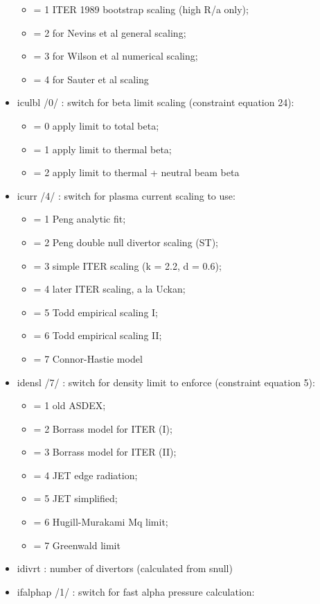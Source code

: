 \documentclass[]{article}
\providecommand{\tightlist}{%
  \setlength{\itemsep}{0pt}\setlength{\parskip}{0pt}}
\begin{document}
\begin{itemize}
  \begin{itemize}
  \tightlist
  \item
    = 1 ITER 1989 bootstrap scaling (high R/a only);
  \item
    = 2 for Nevins et al general scaling;
  \item
    = 3 for Wilson et al numerical scaling;
  \item
    = 4 for Sauter et al scaling
  \end{itemize}
\item
  iculbl /0/ : switch for beta limit scaling (constraint equation 24):

  \begin{itemize}
  \tightlist
  \item
    = 0 apply limit to total beta;
  \item
    = 1 apply limit to thermal beta;
  \item
    = 2 apply limit to thermal + neutral beam beta
  \end{itemize}
\item
  icurr /4/ : switch for plasma current scaling to use:

  \begin{itemize}
  \tightlist
  \item
    = 1 Peng analytic fit;
  \item
    = 2 Peng double null divertor scaling (ST);
  \item
    = 3 simple ITER scaling (k = 2.2, d = 0.6);
  \item
    = 4 later ITER scaling, a la Uckan;
  \item
    = 5 Todd empirical scaling I;
  \item
    = 6 Todd empirical scaling II;
  \item
    = 7 Connor-Hastie model
  \end{itemize}
\item
  idensl /7/ : switch for density limit to enforce (constraint equation
  5):

  \begin{itemize}
  \tightlist
  \item
    = 1 old ASDEX;
  \item
    = 2 Borrass model for ITER (I);
  \item
    = 3 Borrass model for ITER (II);
  \item
    = 4 JET edge radiation;
  \item
    = 5 JET simplified;
  \item
    = 6 Hugill-Murakami Mq limit;
  \item
    = 7 Greenwald limit
  \end{itemize}
\item
  idivrt : number of divertors (calculated from snull)
\item
  ifalphap /1/ : switch for fast alpha pressure calculation:


\end{itemize}
\end{document}
